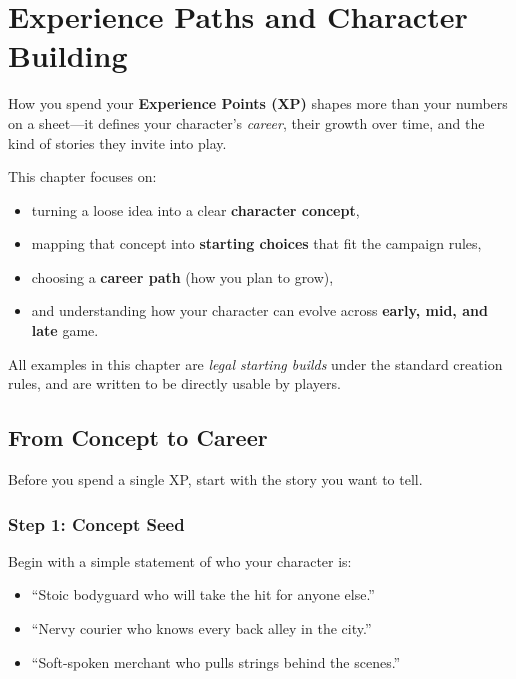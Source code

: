 \chapter{Experience Paths and Character Building}
\label{ch:xp-paths}

How you spend your \textbf{Experience Points (XP)} shapes more than your
numbers on a sheet---it defines your character's \emph{career}, their growth
over time, and the kind of stories they invite into play.

This chapter focuses on:
\begin{itemize}
  \item turning a loose idea into a clear \textbf{character concept},
  \item mapping that concept into \textbf{starting choices} that fit the campaign rules,
  \item choosing a \textbf{career path} (how you plan to grow),
  \item and understanding how your character can evolve across \textbf{early, mid, and late} game.
\end{itemize}

All examples in this chapter are \emph{legal starting builds} under the standard
creation rules, and are written to be directly usable by players.


\section{From Concept to Career}
\label{sec:xp-concept-to-career}

Before you spend a single XP, start with the story you want to tell.

\subsection*{Step 1: Concept Seed}
\label{sec:xp-concept-seed}

Begin with a simple statement of who your character is:
\begin{itemize}
  \item ``Stoic bodyguard who will take the hit for anyone else.''
  \item ``Nervy courier who knows every back alley in the city.''
  \item ``Soft-spoken merchant who pulls strings behind the scenes.''
\end{itemize}


